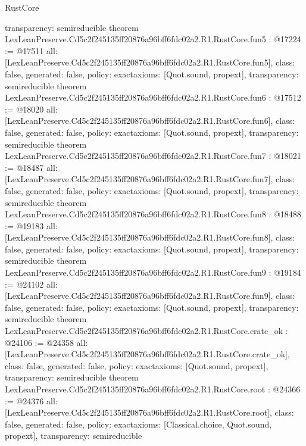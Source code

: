 \begin{lexlean}{RustCore}
\begin{coremodule}
{  transparency: semireducible
}
theorem LexLeanPreserve.Cd5c2f245135ff20876a96bff6fdc02a2.R1.RustCore.fun5 : @17224 := @17511 {
  all: [LexLeanPreserve.Cd5c2f245135ff20876a96bff6fdc02a2.R1.RustCore.fun5],
  class: false,
  generated: false,
  policy: exact{axioms: [Quot.sound, propext]},
  transparency: semireducible
}
theorem LexLeanPreserve.Cd5c2f245135ff20876a96bff6fdc02a2.R1.RustCore.fun6 : @17512 := @18020 {
  all: [LexLeanPreserve.Cd5c2f245135ff20876a96bff6fdc02a2.R1.RustCore.fun6],
  class: false,
  generated: false,
  policy: exact{axioms: [Quot.sound, propext]},
  transparency: semireducible
}
theorem LexLeanPreserve.Cd5c2f245135ff20876a96bff6fdc02a2.R1.RustCore.fun7 : @18021 := @18487 {
  all: [LexLeanPreserve.Cd5c2f245135ff20876a96bff6fdc02a2.R1.RustCore.fun7],
  class: false,
  generated: false,
  policy: exact{axioms: [Quot.sound, propext]},
  transparency: semireducible
}
theorem LexLeanPreserve.Cd5c2f245135ff20876a96bff6fdc02a2.R1.RustCore.fun8 : @18488 := @19183 {
  all: [LexLeanPreserve.Cd5c2f245135ff20876a96bff6fdc02a2.R1.RustCore.fun8],
  class: false,
  generated: false,
  policy: exact{axioms: [Quot.sound, propext]},
  transparency: semireducible
}
theorem LexLeanPreserve.Cd5c2f245135ff20876a96bff6fdc02a2.R1.RustCore.fun9 : @19184 := @24102 {
  all: [LexLeanPreserve.Cd5c2f245135ff20876a96bff6fdc02a2.R1.RustCore.fun9],
  class: false,
  generated: false,
  policy: exact{axioms: [Quot.sound, propext]},
  transparency: semireducible
}
theorem LexLeanPreserve.Cd5c2f245135ff20876a96bff6fdc02a2.R1.RustCore.crate_ok : @24106 := @24358 {
  all: [LexLeanPreserve.Cd5c2f245135ff20876a96bff6fdc02a2.R1.RustCore.crate_ok],
  class: false,
  generated: false,
  policy: exact{axioms: [Quot.sound, propext]},
  transparency: semireducible
}
theorem LexLeanPreserve.Cd5c2f245135ff20876a96bff6fdc02a2.R1.RustCore.root : @24366 := @24376 {
  all: [LexLeanPreserve.Cd5c2f245135ff20876a96bff6fdc02a2.R1.RustCore.root],
  class: false,
  generated: false,
  policy: exact{axioms: [Classical.choice, Quot.sound, propext]},
  transparency: semireducible
}


\end{coremodule}
\end{lexlean}
